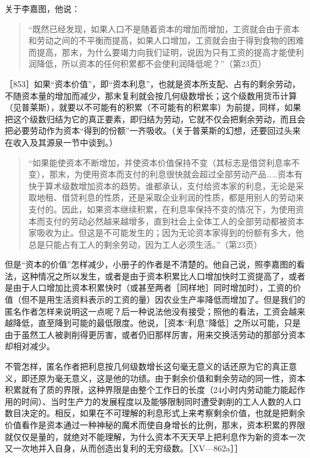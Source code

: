 关于李嘉图，他说：

\begin{quote}{“既然已经发现，如果人口不是随着资本的增加而增加，工资就会由于资本和劳动之间的不平衡而提高，如果人口增加，工资就会由于得到食物的困难而提高，那末，为什么要竭力向我们证明，说因为只有工资的提高才能使利润降低，所以资本的任何积累都不会使利润降低呢？”（第23页）}\end{quote}

［853］如果“资本价值”，即“资本利息”，也就是资本所支配、占有的剩余劳动，不随资本量的增加而减少，那末复利就会按几何级数增长；这个级数用货币计算（见普莱斯），就要以不可能有的积累（不可能有的积累率）为前提，同样，如果把这个级数归结为它的真正要素，即归结为劳动，它就不仅会把剩余劳动，而且会把必要劳动作为资本“得到的份额”一齐吸收。（关于普莱斯的幻想，还要回过头来在收入及其源泉一节中谈到。）

\begin{quote}{“如果能使资本不断增加，并使资本价值保持不变（其标志是借贷利息率不变），那末，为使用资本而支付的利息很快就会超过全部劳动产品……资本有快于算术级数增加资本的趋势。谁都承认，支付给资本家的利息，无论是采取地租、借贷利息的性质，还是采取企业利润的性质，都是用别人的劳动来支付的。因此，如果资本继续积累，在利息率保持不变的情况下，为使用资本而支付的劳动必然越来越增多，直到社会上全体工人的全部劳动都被资本家吸收为止。但这是不可能发生的；因为无论资本家得到的份额有多大，他总是只能占有工人的剩余劳动，因为工人必须生活。”（第23页）}\end{quote}

但是“资本的价值”怎样减少，小册子的作者是不清楚的。他自己说，照李嘉图的看法，这种情况之所以发生，或者是由于资本积累比人口增加快时工资提高了，或者是由于人口增加比资本积累快时（或甚至两者［同样地］同时增加时），工资的价值（但不是用生活资料表示的工资的量）因农业生产率降低而增加了。但是我们的匿名作者怎样来说明这一点呢？后一种说法他没有接受；照他的看法，工资会越来越降低，直至降到可能的最低限度。他说，［资本“利息”降低］之所以可能，只是由于虽然工人被剥削得更厉害，或者仍旧那样厉害，用来交换活劳动的那部分资本却相对减少。

不管怎样，匿名作者把利息按几何级数增长这句毫无意义的话还原为它的真正意义，即还原为毫无意义，这是他的功绩。由于剩余价值和剩余劳动的同一性，资本积累就有了质的界限，这种界限是由整个工作日的长度（24小时内劳动能力能起作用的时间）、当时生产力的发展程度以及能够限制同时遭受剥削的工人人数的人口数目决定的。相反，如果在不可理解的利息形式上来考察剩余价值，也就是把剩余价值看作是资本通过一种神秘的魔术而使自身增长的比例，那末，资本积累的界限就仅仅是量的，就绝对不能理解，为什么资本不天天早上把利息作为新的资本一次又一次地并入自身，从而创造出复利的无穷级数。［XV—862a］］

